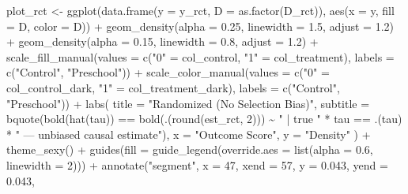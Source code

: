 \documentclass[
  letterpaper,
  DIV=11,
  numbers=noendperiod]{scrreprt}
\newenvironment{Shaded}{\begin{snugshade}}{\end{snugshade}}
\newcommand{\AttributeTok}[1]{\textcolor[rgb]{0.40,0.45,0.13}{#1}}
\newcommand{\DecValTok}[1]{\textcolor[rgb]{0.68,0.00,0.00}{#1}}
\newcommand{\FloatTok}[1]{\textcolor[rgb]{0.68,0.00,0.00}{#1}}
\newcommand{\FunctionTok}[1]{\textcolor[rgb]{0.28,0.35,0.67}{#1}}
\newcommand{\NormalTok}[1]{\textcolor[rgb]{0.00,0.23,0.31}{#1}}
\newcommand{\OtherTok}[1]{\textcolor[rgb]{0.00,0.23,0.31}{#1}}
\newcommand{\SpecialCharTok}[1]{\textcolor[rgb]{0.37,0.37,0.37}{#1}}
\newcommand{\StringTok}[1]{\textcolor[rgb]{0.13,0.47,0.30}{#1}}
\begin{document}
\begin{Shaded}
\begin{Highlighting}[]
\NormalTok{plot\_rct }\OtherTok{\textless{}{-}} \FunctionTok{ggplot}\NormalTok{(}\FunctionTok{data.frame}\NormalTok{(}\AttributeTok{y =}\NormalTok{ y\_rct, }\AttributeTok{D =} \FunctionTok{as.factor}\NormalTok{(D\_rct)),}
\FunctionTok{aes}\NormalTok{(}\AttributeTok{x =}\NormalTok{ y, }\AttributeTok{fill =}\NormalTok{ D, }\AttributeTok{color =}\NormalTok{ D)) }\SpecialCharTok{+}
\FunctionTok{geom\_density}\NormalTok{(}\AttributeTok{alpha =} \FloatTok{0.25}\NormalTok{, }\AttributeTok{linewidth =} \FloatTok{1.5}\NormalTok{, }\AttributeTok{adjust =} \FloatTok{1.2}\NormalTok{) }\SpecialCharTok{+}
\FunctionTok{geom\_density}\NormalTok{(}\AttributeTok{alpha =} \FloatTok{0.15}\NormalTok{, }\AttributeTok{linewidth =} \FloatTok{0.8}\NormalTok{,  }\AttributeTok{adjust =} \FloatTok{1.2}\NormalTok{) }\SpecialCharTok{+}
\FunctionTok{scale\_fill\_manual}\NormalTok{(}\AttributeTok{values =} \FunctionTok{c}\NormalTok{(}\StringTok{"0"} \OtherTok{=}\NormalTok{ col\_control,   }\StringTok{"1"} \OtherTok{=}\NormalTok{ col\_treatment),}
\AttributeTok{labels =} \FunctionTok{c}\NormalTok{(}\StringTok{"Control"}\NormalTok{, }\StringTok{"Preschool"}\NormalTok{)) }\SpecialCharTok{+}
\FunctionTok{scale\_color\_manual}\NormalTok{(}\AttributeTok{values =} \FunctionTok{c}\NormalTok{(}\StringTok{"0"} \OtherTok{=}\NormalTok{ col\_control\_dark, }\StringTok{"1"} \OtherTok{=}\NormalTok{ col\_treatment\_dark),}
\AttributeTok{labels =} \FunctionTok{c}\NormalTok{(}\StringTok{"Control"}\NormalTok{, }\StringTok{"Preschool"}\NormalTok{)) }\SpecialCharTok{+}
\FunctionTok{labs}\NormalTok{(}
\AttributeTok{title    =} \StringTok{"Randomized (No Selection Bias)"}\NormalTok{,}
\AttributeTok{subtitle =} \FunctionTok{bquote}\NormalTok{(}\FunctionTok{bold}\NormalTok{(}\FunctionTok{hat}\NormalTok{(tau)) }\SpecialCharTok{==} \FunctionTok{bold}\NormalTok{(.(}\FunctionTok{round}\NormalTok{(est\_rct, }\DecValTok{2}\NormalTok{))) }\SpecialCharTok{\textasciitilde{}}
\StringTok{" | true "} \SpecialCharTok{*}\NormalTok{ tau }\SpecialCharTok{==}\NormalTok{ .(tau) }\SpecialCharTok{*} \StringTok{" — unbiased causal estimate"}\NormalTok{),}
\AttributeTok{x =} \StringTok{"Outcome Score"}\NormalTok{, }\AttributeTok{y =} \StringTok{"Density"}
\NormalTok{) }\SpecialCharTok{+}
\FunctionTok{theme\_sexy}\NormalTok{() }\SpecialCharTok{+}
\FunctionTok{guides}\NormalTok{(}\AttributeTok{fill =} \FunctionTok{guide\_legend}\NormalTok{(}\AttributeTok{override.aes =} \FunctionTok{list}\NormalTok{(}\AttributeTok{alpha =} \FloatTok{0.6}\NormalTok{, }\AttributeTok{linewidth =} \DecValTok{2}\NormalTok{))) }\SpecialCharTok{+}
\FunctionTok{annotate}\NormalTok{(}\StringTok{"segment"}\NormalTok{, }\AttributeTok{x =} \DecValTok{47}\NormalTok{, }\AttributeTok{xend =} \DecValTok{57}\NormalTok{, }\AttributeTok{y =} \FloatTok{0.043}\NormalTok{, }\AttributeTok{yend =} \FloatTok{0.043}\NormalTok{,}

\end{Highlighting}
\end{Shaded}
\end{document}
